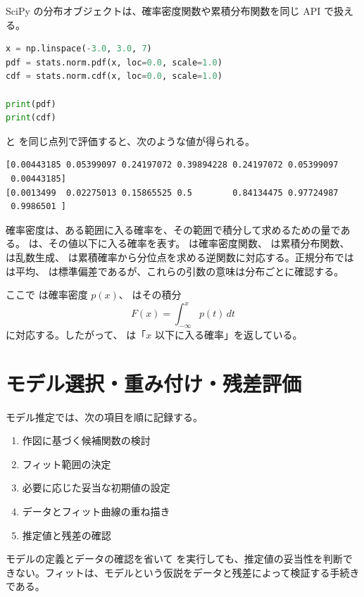 SciPy の分布オブジェクトは、確率密度関数や累積分布関数を同じ API で扱える。

\begin{lstlisting}[language=Python]
x = np.linspace(-3.0, 3.0, 7)
pdf = stats.norm.pdf(x, loc=0.0, scale=1.0)
cdf = stats.norm.cdf(x, loc=0.0, scale=1.0)

print(pdf)
print(cdf)
\end{lstlisting}

 と  を同じ点列で評価すると、次のような値が得られる。

\begin{lstlisting}[numbers=none, xleftmargin=2\zw]
[0.00443185 0.05399097 0.24197072 0.39894228 0.24197072 0.05399097
 0.00443185]
[0.0013499  0.02275013 0.15865525 0.5        0.84134475 0.97724987
 0.9986501 ]
\end{lstlisting}

確率密度は、ある範囲に入る確率を、その範囲で積分して求めるための量である。 は、その値以下に入る確率を表す。 は確率密度関数、 は累積分布関数、 は乱数生成、 は累積確率から分位点を求める逆関数に対応する。正規分布では  は平均、 は標準偏差であるが、これらの引数の意味は分布ごとに確認する。

ここで  は確率密度 \(p(x)\)、 はその積分
\[
F(x) = \int_{-\infty}^{x} p(t)\,dt
\]
に対応する。したがって、 は「\(x\) 以下に入る確率」を返している。

\section{モデル選択・重み付け・残差評価}

モデル推定では、次の項目を順に記録する。

\begin{enumerate}
\item 作図に基づく候補関数の検討
\item フィット範囲の決定
\item 必要に応じた妥当な初期値の設定
\item データとフィット曲線の重ね描き
\item 推定値と残差の確認
\end{enumerate}

モデルの定義とデータの確認を省いて  を実行しても、推定値の妥当性を判断できない。フィットは、モデルという仮説をデータと残差によって検証する手続きである。

